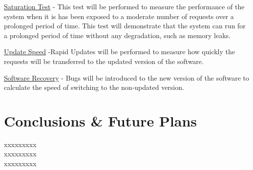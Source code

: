 \documentclass[a4paper,11pt,twoside]{article}
\begin{document}
\noindent
\underline{Saturation Test} - This test will be performed to measure the performance of the system when it is has been exposed to a moderate number of requests over a prolonged period of time. This test will demonstrate that the system can run for a prolonged period of time without any degradation, such as memory leaks.

\noindent
\underline{Update Speed} -Rapid Updates will be performed to measure how quickly the requests will be transferred to the updated version of the software. 

\noindent
\underline{Software Recovery} - Bugs will be introduced to the new version of the software to calculate the speed of switching to the non-updated version.


\clearpage
\section{Conclusions \& Future Plans}
xxxxxxxxx\\
xxxxxxxxx\\
xxxxxxxxx\\
\end{document}
